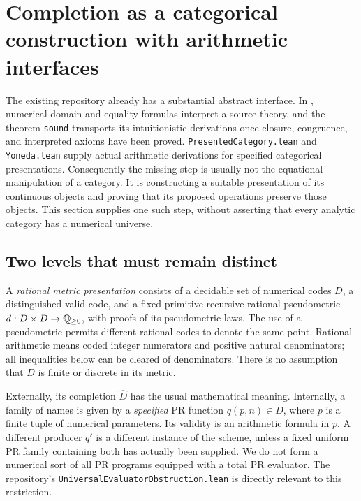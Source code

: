 \section{Completion as a categorical construction with arithmetic interfaces}
\label{sec:cm-completion}

The existing repository already has a substantial abstract interface.  In
, numerical domain and equality
formulas interpret a source theory, and the theorem \texttt{sound} transports
its intuitionistic derivations once closure, congruence, and interpreted axioms
have been proved.  \texttt{PresentedCategory.lean} and \texttt{Yoneda.lean}
supply actual arithmetic derivations for specified categorical presentations.
Consequently the missing step is usually not the equational manipulation of a
category.  It is constructing a suitable presentation of its continuous
objects and proving that its proposed operations preserve those objects.
This section supplies one such step, without asserting that every analytic
category has a numerical universe.

\subsection{Two levels that must remain distinct}

A \emph{rational metric presentation} consists of a decidable set of numerical
codes $D$, a distinguished valid code, and a fixed primitive recursive rational
pseudometric $d:D\times D\to\mathbb Q_{\geq0}$, with proofs of its pseudometric laws.
The use of a pseudometric permits different rational codes to denote the same
point.  Rational arithmetic means coded integer numerators and positive
natural denominators; all inequalities below can be cleared of denominators.
There is no assumption that $D$ is finite or discrete in its metric.

Externally, its completion $\widehat D$ has the usual mathematical meaning.
Internally, a family of names is given by a \emph{specified} PR function
$q(p,n)\in D$, where $p$ is a finite tuple of numerical parameters.  Its
validity is an arithmetic formula in $p$.  A different producer $q'$ is a
different instance of the scheme, unless a fixed uniform PR family containing
both has actually been supplied.  We do not form a numerical sort of all PR
programs equipped with a total PR evaluator.  The repository's
\texttt{UniversalEvaluatorObstruction.lean} is directly relevant to this
restriction.

